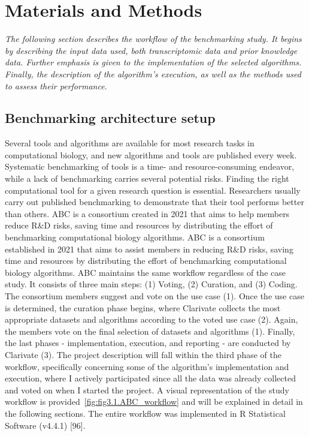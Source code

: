 
%


\chapter{Materials and Methods}
\label{cha:materials_and_methods}


\textit{The following section describes the workflow of the benchmarking study. It begins by describing the input data used, both transcriptomic data and prior knowledge data. Further emphasis is given to the implementation of the selected algorithms. Finally, the description of the algorithm's execution, as well as the methods used to assess their performance.}


\section{Benchmarking architecture setup} %
\label{sec:benchmarking_architecture_setup}

Several tools and algorithms are available for most research tasks in computational biology, and new algorithms and tools are published every week. Systematic benchmarking of tools is a time- and resource-consuming endeavor, while a lack of benchmarking carries several potential risks. Finding the right computational tool for a given research question is essential. Researchers usually carry out published benchmarking to demonstrate that their tool performs better than others. ABC is a consortium created in 2021 that aims to help members reduce R\&D risks, saving time and resources by distributing the effort of benchmarking computational biology algorithms. ABC is a consortium established in 2021 that aims to assist members in reducing R\&D risks, saving time and resources by distributing the effort of benchmarking computational biology algorithms. ABC maintains the same workflow regardless of the case study. It consists of three main steps: (1) Voting, (2) Curation, and (3) Coding. The consortium members suggest and vote on the use case (1). Once the use case is determined, the curation phase begins, where Clarivate collects the most appropriate datasets and algorithms according to the voted use case (2). Again, the members vote on the final selection of datasets and algorithms (1). Finally, the last phases - implementation, execution, and reporting - are conducted by Clarivate (3). 
The project description will fall within the third phase of the workflow, specifically concerning some of the algorithm's implementation and execution, where I actively participated since all the data was already collected and voted on when I started the project. A visual representation of the study workflow is provided~\ref{fig:fig3.1.ABC_workflow} and will be explained in detail in the following sections. The entire workflow was implemented in \gls{R} Statistical Software (v4.4.1) [96].

